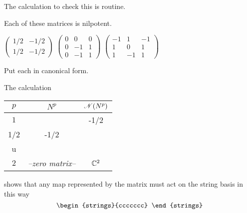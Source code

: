 \begin{exercises}
\begin{answer}
\begin{exparts}
        \partsitem The calculation to check this is routine.
      \end{exparts}
    \end{answer}
  \recommended \item
    Each of these matrices is nilpotent.
    \begin{exparts*}
      \partsitem \(
        \begin{pmatrix}
          1/2  &-1/2  \\
          1/2  &-1/2
        \end{pmatrix}        \)
      \partsitem \(
        \begin{pmatrix}
          0  &0  &0  \\
          0  &-1 &1  \\
          0  &-1 &1
        \end{pmatrix}        \)
      \partsitem \(
        \begin{pmatrix}
         -1  &1  &-1 \\
          1  &0  &1  \\
          1  &-1 &1
        \end{pmatrix}        \)
    \end{exparts*}
    Put each in canonical form.
    \begin{answer}
      \begin{exparts*}
      \partsitem The calculation 
        \begin{center}
          \begin{tabular}{c|cc}
             \( p \)  &\( N^p \)  &\( \mathscr{N}(N^p)  \)   \\  \hline
             \( 1 \)
               &\(\begin{pmatrix}
                    1/2  &-1/2  \\
                    1/2  &-1/2 
                  \end{pmatrix}  \)
               &\( \set{\colvec{u \\ u} 
                              \suchthat u\in\C}  \) \\[2ex]
            \( 2 \)
               &\textit{--zero matrix--}
               &\( \mathbb{C}^2 \)
          \end{tabular}
        \end{center}
        shows that any map represented by the matrix
        must act on the string basis in this way 
        \begin{equation*}
          \begin{strings}{ccccccc}

\end{strings}
\end{equation*}
\end{exparts*}
\end{answer}
\end{exercises}
